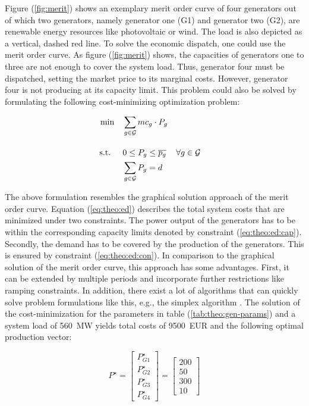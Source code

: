 Figure (\ref{fig:merit}) shows an exemplary merit order curve of four generators out of which two generators, namely generator one (G1) and generator two (G2), are renewable energy resources like photovoltaic or wind. The load is also depicted as a vertical, dashed red line. To solve the economic dispatch, one could use the merit order curve. As figure (\ref{fig:merit}) shows, the capacities of generators one to three are not enough to cover the system load. Thus, generator four must be dispatched, setting the market price to its marginal costs. However, generator four is not producing at its capacity limit. This problem could also be solved by formulating the following cost-minimizing optimization problem:

\begin{subequations}
	\begin{align}
		 \min \quad & \sum_{g\in\mathcal{G}}mc_g \cdot P_{g} \label{eq:theo:ed} \\[10pt]
		 \text{s.t. } \quad & 0 \leq P_{g} \leq \overline{p_g} && \forall g \in \mathcal{G} \label{eq:theo:ed:cap} \\
		 & \sum_{g \in \mathcal{G}} P_{g} = d \label{eq:theo:ed:con}
	\end{align}
\end{subequations}

The above formulation resembles the graphical solution approach of the merit order curve. Equation (\ref{eq:theo:ed}) describes the total system costs that are minimized under two constraints. The power output of the generators has to be within the corresponding capacity limits denoted by constraint (\ref{eq:theo:ed:cap}). Secondly, the demand has to be covered by the production of the generators. This is ensured by constraint (\ref{eq:theo:ed:con}). In comparison to the graphical solution of the merit order curve, this approach has some advantages. First, it can be extended by multiple periods and incorporate further restrictions like ramping constraints. In addition, there exist a lot of algorithms that can quickly solve problem formulations like this, e.g., the simplex algorithm \citep{dantzig1963}. The solution of the cost-minimization for the parameters in table (\ref{tab:theo:gen-params}) and a system load of \SI{560}{\mega\watt} yields total costs of \SI{9500}{EUR} and the following optimal production vector:

\begin{equation}
	P^{\star} = \begin{bmatrix}
		P_{G1}^{\star} \\
		P_{G2}^{\star} \\
		P_{G3}^{\star} \\
		P_{G4}^{\star}
	\end{bmatrix} = \begin{bmatrix}
		200 \\
		50 \\
		300 \\
		10
	\end{bmatrix}
\end{equation}

